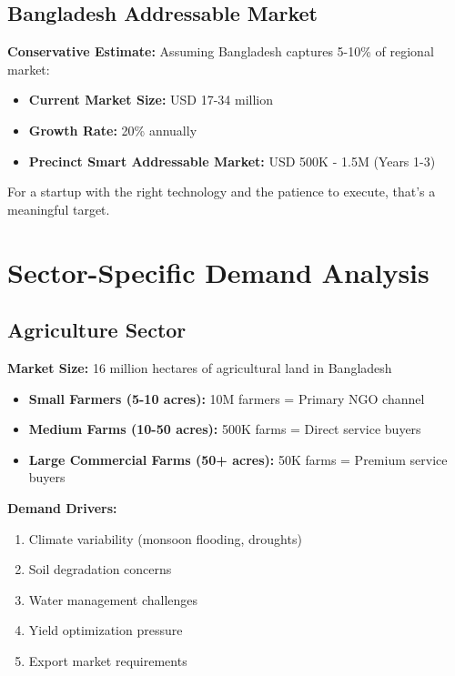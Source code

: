 \subsection{Bangladesh Addressable Market}

\begin{importantbox}
    \textbf{Conservative Estimate:} Assuming Bangladesh captures 5-10\% of regional market:
    \begin{itemize}
        \item \textbf{Current Market Size:} USD 17-34 million
        \item \textbf{Growth Rate:} 20\% annually
        \item \textbf{Precinct Smart Addressable Market:} USD 500K - 1.5M (Years 1-3)
    \end{itemize}
\end{importantbox}

For a startup with the right technology and the patience to execute, that's a meaningful target.

\newpage

\section{Sector-Specific Demand Analysis}

\subsection{Agriculture Sector}

\textbf{Market Size:} 16 million hectares of agricultural land in Bangladesh

\begin{itemize}
    \item \textbf{Small Farmers (5-10 acres):} 10M farmers = Primary NGO channel
    \item \textbf{Medium Farms (10-50 acres):} 500K farms = Direct service buyers
    \item \textbf{Large Commercial Farms (50+ acres):} 50K farms = Premium service buyers
\end{itemize}

\textbf{Demand Drivers:}
\begin{enumerate}
    \item Climate variability (monsoon flooding, droughts)
    \item Soil degradation concerns
    \item Water management challenges
    \item Yield optimization pressure
    \item Export market requirements
\end{enumerate}

